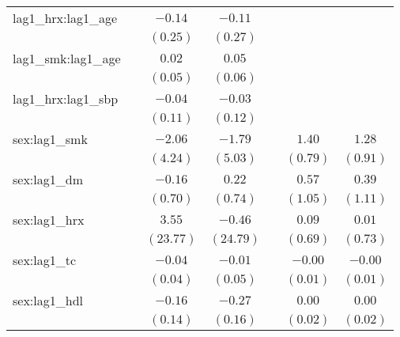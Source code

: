 \begin{tabular}{l c c c c c c}
lag1\_hrx:lag1\_age               &              & $-0.14$    & $-0.11$    &                &                &                \\
                                  &              & $(0.25)$   & $(0.27)$   &                &                &                \\
lag1\_smk:lag1\_age               &              & $0.02$     & $0.05$     &                &                &                \\
                                  &              & $(0.05)$   & $(0.06)$   &                &                &                \\
lag1\_hrx:lag1\_sbp               &              & $-0.04$    & $-0.03$    &                &                &                \\
                                  &              & $(0.11)$   & $(0.12)$   &                &                &                \\
sex:lag1\_smk                     &              & $-2.06$    & $-1.79$    &                & $1.40$         & $1.28$         \\
                                  &              & $(4.24)$   & $(5.03)$   &                & $(0.79)$       & $(0.91)$       \\
sex:lag1\_dm                      &              & $-0.16$    & $0.22$     &                & $0.57$         & $0.39$         \\
                                  &              & $(0.70)$   & $(0.74)$   &                & $(1.05)$       & $(1.11)$       \\
sex:lag1\_hrx                     &              & $3.55$     & $-0.46$    &                & $0.09$         & $0.01$         \\
                                  &              & $(23.77)$  & $(24.79)$  &                & $(0.69)$       & $(0.73)$       \\
sex:lag1\_tc                      &              & $-0.04$    & $-0.01$    &                & $-0.00$        & $-0.00$        \\
                                  &              & $(0.04)$   & $(0.05)$   &                & $(0.01)$       & $(0.01)$       \\
sex:lag1\_hdl                     &              & $-0.16$    & $-0.27$    &                & $0.00$         & $0.00$         \\
                                  &              & $(0.14)$   & $(0.16)$   &                & $(0.02)$       & $(0.02)$       \\

\end{tabular}
